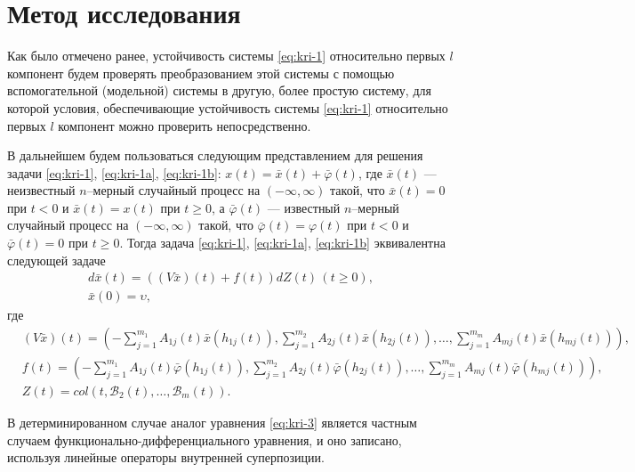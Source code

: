\section{Метод исследования}\label{sec:kri-2}

Как было отмечено ранее,
устойчивость системы \eqref{eq:kri-1} относительно первых $l$ компонент будем
проверять преобразованием этой системы с помощью вспомогательной
(модельной) системы в другую, более простую систему, для которой
условия, обеспечивающие устойчивость системы \eqref{eq:kri-1} относительно первых
$l$ компонент можно проверить непосредственно.

В дальнейшем будем пользоваться следующим представлением для решения
задачи \eqref{eq:kri-1}, \eqref{eq:kri-1a}, \eqref{eq:kri-1b}: $x(t) = \bar x(t) + \bar \varphi (t)$, где
$\bar x(t)$ --- неизвестный $n$--мерный случайный процесс на
$(-\infty, \infty)$ такой, что $\bar x(t) = 0$ при $t < 0$ и $\bar
x(t) = x(t)$ при $t \geq 0$,  а $\bar  \varphi (t)$ --- известный
$n$--мерный случайный процесс на $(-\infty, \infty)$ такой, что
$\bar \varphi(t) = \varphi (t)$ при $t < 0$ и $\bar \varphi(t) = 0$
при $t \geq 0$.  Тогда  задача \eqref{eq:kri-1}, \eqref{eq:kri-1a}, \eqref{eq:kri-1b} эквивалентна
следующей задаче
\begin{gather}
    \label{eq:kri-3}
    d\bar x(t) =  ((V\bar x)(t) +f(t))dZ(t) {\,} (t \ge 0),
    \\
    \label{eq:kri-3b}
    \bar x(0) = \upsilon,
\end{gather}
где
\begin{align*}
    &(V\bar x)(t)= \left(- \sum \limits_{j=1}^{m_1}A_{1j}(t)\bar
    x(h_{1j}(t)), \sum \limits_{j=1}^{m_2}A_{2j}(t)\bar x(h_{2j}(t)),
    \dots, \sum \limits_{j=1}^{m_m}A_{mj}(t)\bar x(h_{mj}(t))\right),
    \\
    &f(t)= \left(- \sum \limits_{j=1}^{m_1}A_{1j}(t)\bar
    \varphi(h_{1j}(t)), \sum \limits_{j=1}^{m_2}A_{2j}(t)\bar \varphi
    (h_{2j}(t)), \dots, \sum \limits_{j=1}^{m_m}A_{mj}(t)\bar \varphi
    (h_{mj}(t))\right),
    \\
    &Z(t)= col (t, \mathcal  B_2(t), \dots,\mathcal B_m(t)).
\end{align*}

\begin{remark}\label{rem:kri-1}
    В детерминированном случае аналог уравнения \eqref{eq:kri-3}
    является частным случаем функционально-дифференциального уравнения,
    и оно записано, используя линейные \linebreak операторы внутренней
    суперпозиции.
\end{remark}

